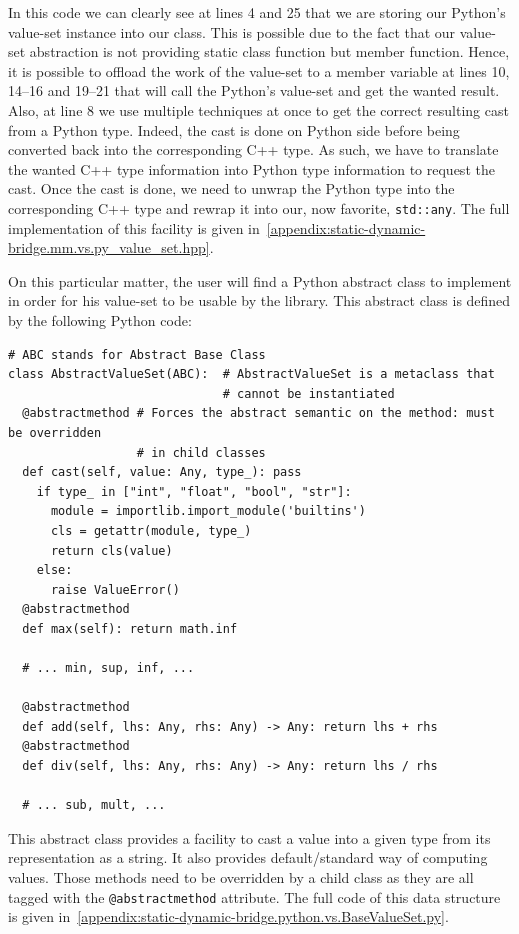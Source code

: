 In this code we can clearly see at lines 4 and 25 that we are storing our Python's value-set instance into our class.
This is possible due to the fact that our value-set abstraction is not providing static class function but member
function. Hence, it is possible to offload the work of the value-set to a member variable at lines 10, 14--16 and 19--21
that will call the Python's value-set and get the wanted result. Also, at line 8 we use multiple techniques at once to
get the correct resulting cast from a Python type. Indeed, the cast is done on Python side before being converted back
into the corresponding C++ type. As such, we have to translate the wanted C++ type information into Python type
information to request the cast. Once the cast is done, we need to unwrap the Python type into the corresponding C++
type and rewrap it into our, now favorite, \texttt{std::any}. The full implementation of this facility is given
in~\cref{appendix:static-dynamic-bridge.mm.vs.py_value_set.hpp}.

On this particular matter, the user will find a Python abstract class to implement in order for his value-set to be
usable by the library. This abstract class is defined by the following Python code:

\begin{verbatim}
# ABC stands for Abstract Base Class
class AbstractValueSet(ABC):  # AbstractValueSet is a metaclass that
                              # cannot be instantiated
  @abstractmethod # Forces the abstract semantic on the method: must be overridden
                  # in child classes
  def cast(self, value: Any, type_): pass
    if type_ in ["int", "float", "bool", "str"]:
      module = importlib.import_module('builtins')
      cls = getattr(module, type_)
      return cls(value)
    else:
      raise ValueError()
  @abstractmethod
  def max(self): return math.inf

  # ... min, sup, inf, ...

  @abstractmethod
  def add(self, lhs: Any, rhs: Any) -> Any: return lhs + rhs
  @abstractmethod
  def div(self, lhs: Any, rhs: Any) -> Any: return lhs / rhs

  # ... sub, mult, ...
\end{verbatim}

This abstract class provides a facility to cast a value into a given type from its representation as a string. It also
provides default/standard way of computing values. Those methods need to be overridden by a child class as they are all
tagged with the \texttt{@abstractmethod} attribute. The full code of this data structure is given
in~\cref{appendix:static-dynamic-bridge.python.vs.BaseValueSet.py}.

